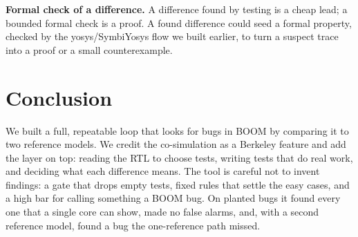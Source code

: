\documentclass[conference]{IEEEtran}
\begin{document}
\textbf{Formal check of a difference.} A difference found by testing is a cheap
lead; a bounded formal check is a proof. A found difference could seed a formal
property, checked by the yosys/SymbiYosys flow we built earlier, to turn a
suspect trace into a proof or a small counterexample.

\section{Conclusion}
We built a full, repeatable loop that looks for bugs in BOOM by comparing it to
two reference models. We credit the co-simulation as a Berkeley feature and add
the layer on top: reading the RTL to choose tests, writing tests that do real
work, and deciding what each difference means. The tool is careful not to invent
findings: a gate that drops empty tests, fixed rules that settle the easy cases,
and a high bar for calling something a BOOM bug. On planted bugs it found every
one that a single core can show, made no false alarms, and, with a second
reference model, found a bug the one-reference path missed.



\end{document}
